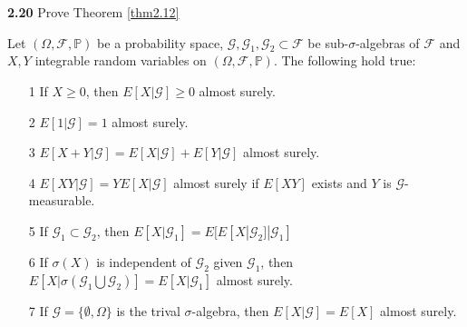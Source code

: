 \noindent\textbf{2.20} Prove Theorem \ref{thm2.12}
\begin{theorem}
    \label{thm2.12}
    Let $(\Omega,\mathcal{F},\mathbb{P})$ be a probability space, $\mathcal{G},\mathcal{G}_1,\mathcal{G}_2 \subset \mathcal{F}$ be sub-$\sigma$-algebras of $\mathcal{F}$ and $X,Y$ integrable random variables on $(\Omega,\mathcal{F},\mathbb{P})$. The following hold true:
    \begin{enumerate}
        \item[1] If $X \geq 0$, then $E[X|\mathcal{G}] \geq 0$ almost surely.
        \item[2] $E[1|\mathcal{G}]=1$ almost surely. 
        \item[3] $E[X+Y|\mathcal{G}] = E[X|\mathcal{G}]+E[Y|\mathcal{G}]$ almost surely. 
        \item[4] $E[XY|\mathcal{G}] = YE[X|\mathcal{G}]$ almost surely if $E[XY]$ exists and $Y$ is $\mathcal{G}$-measurable.
        \item[5] If $\mathcal{G}_1\subset\mathcal{G}_2$, then $E[X|\mathcal{G}_1] = E[E[X|\mathcal{G}_2]|\mathcal{G}_1]$
        \item[6] If $\sigma(X)$ is independent of $\mathcal{G}_2$ given $\mathcal{G}_1$, then $E[X|\sigma(\mathcal{G}_1\bigcup \mathcal{G}_2)] = E[X|\mathcal{G}_1]$ almost surely. 
        \item[7] If $\mathcal{G} = \{\emptyset,\Omega\}$ is the trival $\sigma$-algebra, then $E[X|\mathcal{G}] = E[X]$ almost surely.   
    \end{enumerate}
\end{theorem}

